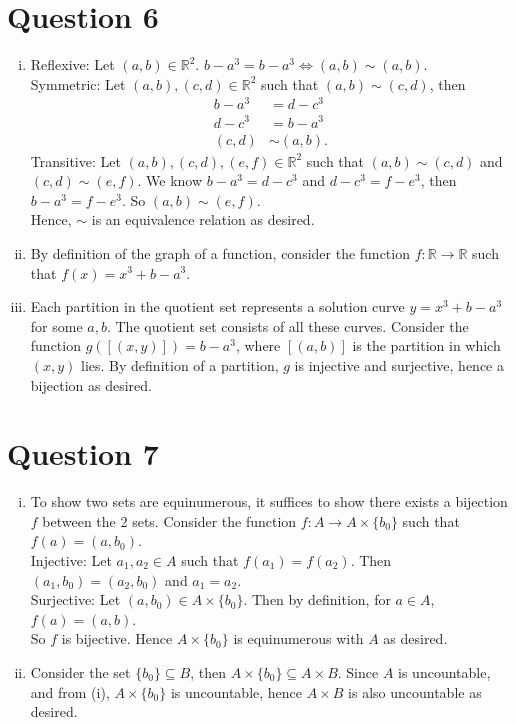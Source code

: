 \documentclass[11pt]{article}
\begin{document}
\section*{Question 6}
\begin{enumerate}[(i)]
    \item 
    Reflexive: Let $(a,b)\in \mathbb{R}^2$. $b-a^3=b-a^3\Leftrightarrow (a,b)\sim(a,b)$.\\
    Symmetric: Let $(a,b),(c,d)\in \mathbb{R}^2$ such that $(a,b)\sim (c,d)$, then \begin{align*}
        b-a^3&=d-c^3\\
        d-c^3&=b-a^3\\
        (c,d)&\sim (a,b).
    \end{align*}
    Transitive: Let $(a,b),(c,d),(e,f)\in \mathbb{R}^2$ such that $(a,b)\sim (c,d)$ and $(c,d)\sim (e,f)$. We know $b-a^3=d-c^3$ and $d-c^3=f-e^3$, then $b-a^3=f-e^3$. So $(a,b)\sim (e,f).$\\
    Hence, $\sim$ is an equivalence relation as desired.
    \item
    By definition of the graph of a function, consider the function $f:\mathbb{R} \to \mathbb{R}$ such that $f(x)=x^3+b-a^3$. 
    \item
    Each partition in the quotient set represents a solution curve $y=x^3+b-a^3$ for some $a,b$. The quotient set consists of all these curves. Consider the function $g([(x,y)])=b-a^3$, where $[(a,b)]$ is the partition in which $(x,y)$ lies. By definition of a partition, $g$ is injective and surjective, hence a bijection as desired.
\end{enumerate}
\section*{Question 7}
\begin{enumerate}[(i)]
    \item 
    To show two sets are equinumerous, it suffices to show there exists a bijection $f$ between the 2 sets. Consider the function $f:A\to A\times \{b_0\}$ such that $f(a)=(a,b_0)$. \\
    Injective: Let $a_1,a_2\in A$ such that $f(a_1)=f(a_2)$. Then $(a_1,b_0)=(a_2,b_0)$ and $a_1=a_2.$\\
    Surjective: Let $(a,b_0)\in A\times \{b_0\}$. Then by definition,  for $a\in A$, $f(a)=(a,b)$. \\
    So $f$ is bijective. Hence $A\times \{b_0\}$ is equinumerous with $A$ as desired.
    \item
    Consider the set $\{b_0\}\subseteq B$, then $A\times \{b_0\} \subseteq A\times B$. Since $A$ is uncountable, and from (i), $A\times \{b_0\}$ is uncountable, hence $A\times B$ is also uncountable as desired.
\end{enumerate}
\end{document}
